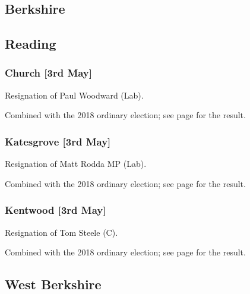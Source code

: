 \documentclass[a4paper,openany]{book}
\begin{document}
\begin{resultsiii}
\section{Berkshire}

\subsection*{Reading}

\subsubsection*{Church \hspace*{\fill}\nolinebreak[1]%
\enspace\hspace*{\fill}
[3rd May]}


Resignation of Paul Woodward (Lab).

Combined with the 2018 ordinary election; see page \pageref{ChurchReading} for the result.

\subsubsection*{Katesgrove \hspace*{\fill}\nolinebreak[1]%
\enspace\hspace*{\fill}
[3rd May]}


Resignation of Matt Rodda MP (Lab).

Combined with the 2018 ordinary election; see page \pageref{KatesgroveReading} for the result.

\subsubsection*{Kentwood \hspace*{\fill}\nolinebreak[1]%
\enspace\hspace*{\fill}
[3rd May]}


Resignation of Tom Steele (C).

Combined with the 2018 ordinary election; see page \pageref{KentwoodReading} for the result.

\subsection*{West Berkshire}


\end{resultsiii}
\end{document}
